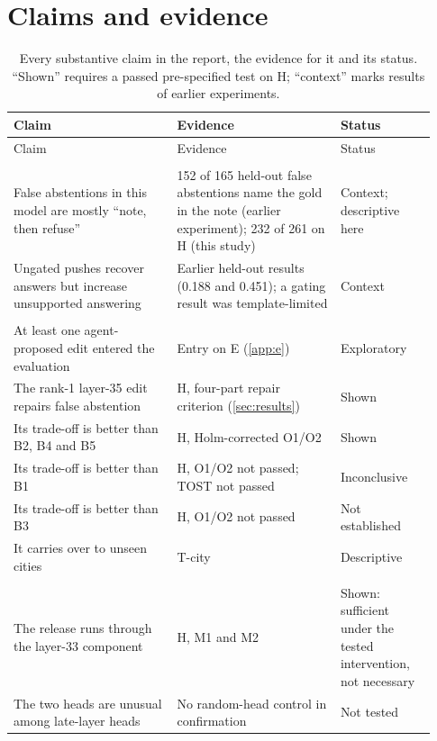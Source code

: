\section{Claims and evidence}
\label{app:claims}

\begingroup\small
\begin{longtable}{@{}L{0.36\linewidth}L{0.36\linewidth}L{0.21\linewidth}@{}}
\caption{Every substantive claim in the report, the evidence for it and its status. ``Shown'' requires a passed
pre-specified test on H; ``context'' marks results of earlier experiments.}\label{tab:claims}\\
\toprule
Claim & Evidence & Status \\
\midrule
\endfirsthead
\toprule
Claim & Evidence & Status \\
\midrule
\endhead
\bottomrule
\endfoot
{} \\*
False abstentions in this model are mostly ``note, then refuse'' & 152 of 165 held-out false abstentions name the
gold in the note (earlier experiment); 232 of 261 on H (this study) & Context; descriptive here \\
Ungated pushes recover answers but increase unsupported answering & Earlier held-out results (0.188 and 0.451); a
gating result was template-limited & Context \\
\addlinespace
{} \\*
At least one agent-proposed edit entered the evaluation & Entry on E (\cref{app:e}) & Exploratory \\
The rank-1 layer-35 edit repairs false abstention & H, four-part repair criterion (\cref{sec:results}) & Shown \\
Its trade-off is better than B2, B4 and B5 & H, Holm-corrected O1/O2 & Shown \\
Its trade-off is better than B1 & H, O1/O2 not passed; TOST not passed & Inconclusive \\
Its trade-off is better than B3 & H, O1/O2 not passed & Not established \\
It carries over to unseen cities & T-city & Descriptive \\
\addlinespace
{} \\*
The release runs through the layer-33 component & H, M1 and M2 & Shown: sufficient under the tested intervention,
not necessary \\
The two heads are unusual among late-layer heads & No random-head control in confirmation & Not tested \\

\end{longtable}
